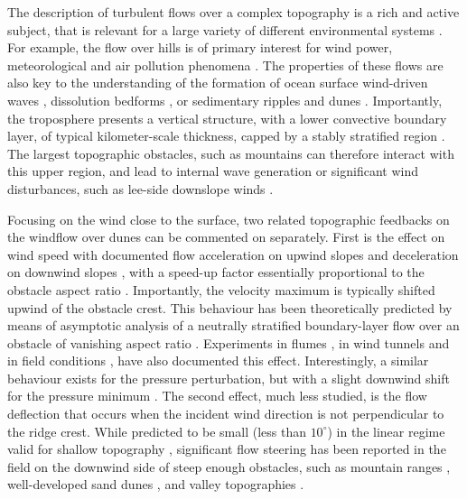 The description of turbulent flows over a complex topography is a rich and active subject, that is relevant for a large variety of different environmental systems \citep{Finnigan2020}. For example, the flow over hills is of primary interest for wind power, meteorological and air pollution phenomena \citep{Taylor1987}. The properties of these flows are also key to the understanding of the formation of ocean surface wind-driven waves \citep{Sullivan2010}, dissolution bedforms \citep{Claudin2017}, or sedimentary ripples and dunes \citep{Charru2013, Courrech2015}. Importantly, the troposphere presents a vertical structure, with a lower convective boundary layer, of typical kilometer-scale thickness, capped by a stably stratified region \citep{Stull1988}. The largest topographic obstacles, such as mountains can therefore interact with this upper region, and lead to internal wave generation or significant wind disturbances, such as lee-side downslope winds \citep{Durran1990}.

Focusing on the wind close to the surface, two related topographic feedbacks on the windflow over dunes can be commented on separately. First is the effect on wind speed with documented flow acceleration on upwind slopes \citep{Weaver2011} and deceleration on downwind slopes \citep{Baddock2007}, with a speed-up factor essentially proportional to the obstacle aspect ratio \citep{Jackson1975}. Importantly, the velocity maximum is typically shifted upwind of the obstacle crest. This behaviour has been theoretically predicted by means of asymptotic analysis of a neutrally stratified boundary-layer flow over an obstacle of vanishing aspect ratio \citep{Jackson1975, Mason1979, Sykes1980, Hunt1988, Belcher1998}. Experiments in flumes \citep{Zilker1977, Zilker1979, Frederick1988, Poggi2007}, in wind tunnels \citep{Gong1989, Finnigan1990, Gong1996} and in field conditions \citep{Taylor1987a, Claudin2013, Fernando2019, Lu2021, Bristow2022}, have also documented this effect. Interestingly, a similar behaviour exists for the pressure perturbation, but with a slight downwind shift for the pressure minimum \citep{Claudin2021}. The second effect, much less studied, is the flow deflection that occurs when the incident wind direction is not perpendicular to the ridge crest. While predicted to be small (less than $10^{\circ}$) in the linear regime valid for shallow topography \citep{Gadal2019}, significant flow steering has been reported in the field on the downwind side of steep enough obstacles, such as mountain ranges \citep{Kim2000, Lewis2008, Fernando2019}, well-developed sand dunes \citep{Walker2009, Hesp2015, Walker2017, Smith2017}, and valley topographies \citep{Wiggs2002}.

